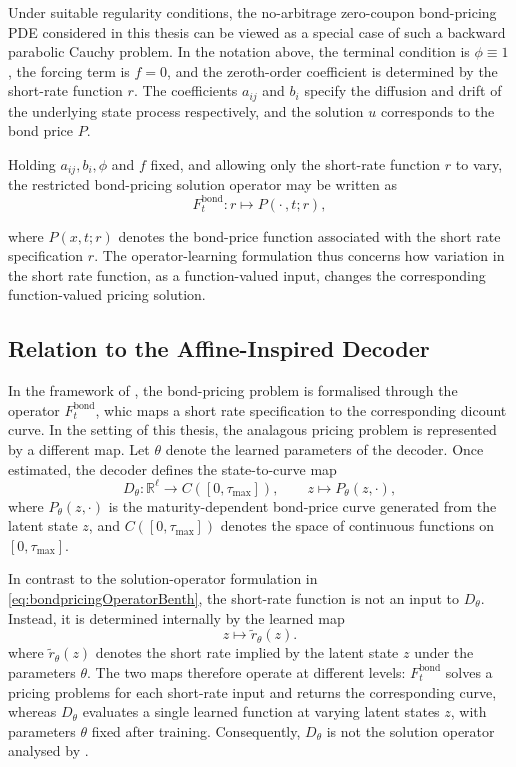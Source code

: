 Under suitable regularity conditions, the no-arbitrage zero-coupon bond-pricing PDE considered in this thesis can be viewed as a special case of such a backward parabolic Cauchy problem. In the notation above, the terminal condition is $\phi \equiv 1$, the forcing term is $f=0$, and the zeroth-order coefficient is determined by the short-rate function $r$. The coefficients $a_{ij}$ and $b_i$ specify the diffusion and drift of the underlying state process respectively, and the solution $u$ corresponds to the bond price $P$.

Holding $a_{ij}, b_i, \phi$ and $f$ fixed, and allowing only the short-rate function $r$ to vary, the restricted bond-pricing solution operator may be written as 
\begin{equation}
    F^{\mathrm{bond}}_t: r\longmapsto P(\cdot\,,t;r),
    \label{eq:bondpricingOperatorBenth}
\end{equation}

where $P(x,t;r)$ denotes the bond-price function associated with the short rate specification $r$. The operator-learning formulation thus concerns how variation in the short rate function, as a function-valued input, changes the corresponding function-valued pricing solution.







\subsection{Relation to the Affine-Inspired Decoder}

In the framework of \citet{Benth2024}, the bond-pricing problem is formalised through the operator $F_t^{\text{bond}}$, whic maps a short rate specification to the corresponding dicount curve. In the setting of this thesis, the analagous pricing problem is represented by a different map. Let $\theta$ denote the learned parameters of the decoder. Once estimated, the decoder defines the state-to-curve map
\[
D_\theta:
\mathbb{R}^{\ell}
\longrightarrow
C([0,\tau_{\max}]),
\qquad
z
\longmapsto
P_\theta(z,\cdot),
\]
where \(P_\theta(z,\cdot)\) is the maturity-dependent bond-price curve generated from the latent state \(z\), and $C([0,\tau_{\text{max}}])$ denotes the space of continuous functions on $[0,\tau_{\text{max}}]$.



In contrast to the solution-operator formulation in \eqref{eq:bondpricingOperatorBenth}, the short-rate function is not an input to \(D_\theta\). Instead, it is determined internally by the learned map
\[
z
\longmapsto
\widetilde r_\theta(z).
\]
where $\tilde{r}_\theta(z)$ denotes the short rate implied by the latent state $z$ under the parameters $\theta$. The two maps therefore operate at different levels: $F_t^{\text{bond}}$ solves a pricing problems for each short-rate input and returns the corresponding curve, whereas $D_\theta$ evaluates a single learned function at varying latent states $z$, with parameters $\theta$ fixed after training. Consequently, \(D_\theta\) is not the solution operator analysed by \citet{Benth2024}.



